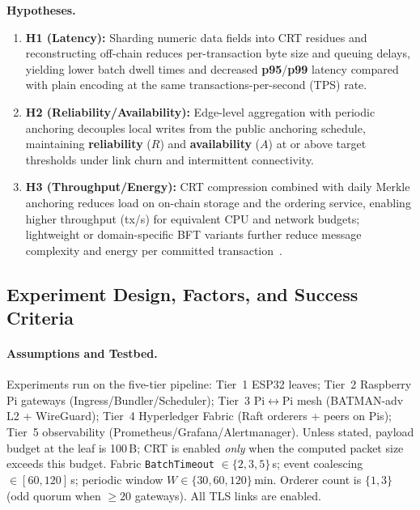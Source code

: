 \documentclass[12pt,onecolumn]{IEEEtran} %
\begin{document}
\textbf{Hypotheses.}
\begin{enumerate}[leftmargin=*, itemsep=0.4em]
  \item \textbf{H1 (Latency):} Sharding numeric data fields into CRT residues and reconstructing off-chain reduces per-transaction byte size and queuing delays, yielding lower batch dwell times and decreased \textbf{p95}/\textbf{p99} latency compared with plain encoding at the same transactions-per-second (TPS) rate.
  \item \textbf{H2 (Reliability/Availability):} Edge-level aggregation with periodic anchoring decouples local writes from the public anchoring schedule, maintaining \textbf{reliability} ($R$) and \textbf{availability} ($A$) at or above target thresholds under link churn and intermittent connectivity.
  \item \textbf{H3 (Throughput/Energy):} CRT compression combined with daily Merkle anchoring reduces load on on-chain storage and the ordering service, enabling higher throughput (tx/s) for equivalent CPU and network budgets; lightweight or domain-specific BFT variants further reduce message complexity and energy per committed transaction~\cite{haque2024scalable,coinspaid2023dag}.
\end{enumerate}

\subsection{Experiment Design, Factors, and Success Criteria}
\label{sec:exp-design}

\paragraph{Assumptions and Testbed.}
Experiments run on the five-tier pipeline: Tier~1 ESP32 leaves; Tier~2 Raspberry Pi gateways (Ingress/Bundler/Scheduler); Tier~3 Pi$\leftrightarrow$Pi mesh (BATMAN-adv L2 + WireGuard); Tier~4 Hyperledger Fabric (Raft orderers + peers on Pis); Tier~5 observability (Prometheus/Grafana/Alertmanager).
Unless stated, payload budget at the leaf is 100\,B; CRT is enabled \emph{only} when the computed packet size exceeds this budget. Fabric \texttt{BatchTimeout} $\in \{2,3,5\}$\,s; event coalescing $\in[60,120]$\,s; periodic window $W\in\{30,60,120\}$\,min. Orderer count is $\{1,3\}$ (odd quorum when $\geq 20$ gateways). All TLS links are enabled.
\end{document}
